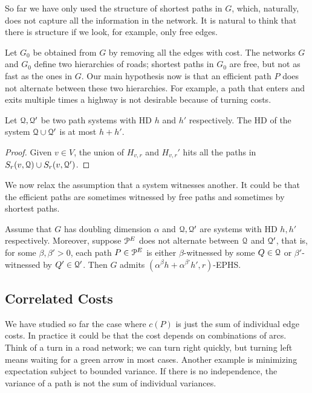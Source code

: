 
So far we have only used the structure of shortest paths in $G$, which, naturally, does not capture all the information in the network.
It is natural to think that there is structure if we look, for example, only free edges.

Let $G_0$ be obtained from $G$ by removing all the edges with cost.
The networks $G$ and $G_0$ define two hierarchies of roads; shortest paths in $G_0$ are free, but not as fast as the ones in $G$.
Our main hypothesis now is that an efficient path $P$ does not alternate between these two hierarchies.
For example, a path that enters and exits multiple times a highway is not desirable because of turning costs.

\begin{proposition}
Let $\mathcal{Q},\mathcal{Q}'$ be two path systems with HD $h$ and $h'$ respectively.
The HD of the system $\mathcal{Q}\cup\mathcal{Q}'$ is at most $h+h'$.
\end{proposition}
\begin{proof}
Given $v\in V$, the union of $H_{v,r}$ and $H_{v,r}'$ hits all the paths in $S_r(v,\mathcal{Q})\cup S_r(v,\mathcal{Q}')$.
\end{proof}

We now relax the assumption that a system witnesses another.
It could be that the efficient paths are sometimes witnessed by free paths and sometimes by shortest paths.

\begin{theorem}
Assume that $G$ has doubling dimension $\alpha$ and $\mathcal{Q},\mathcal{Q}'$ are systems with HD $h,h'$ respectively. 
Moreover, suppose $\mathcal{P}^E$ does not alternate between $\mathcal{Q}$ and $\mathcal{Q}'$, that is, for some $\beta,\beta'>0$, each path $P\in\mathcal{P}^E$ is either $\beta$-witnessed by some $Q\in\mathcal{Q}$ or $\beta'$-witnessed by $Q'\in\mathcal{Q}'$. Then $G$ admits  $(\alpha^{\beta}h+\alpha^{\beta'}h',r)$-EPHS.
\end{theorem}


\subsection{Correlated Costs}
We have studied so far the case where $c(P)$ is just the sum of individual edge costs.
In practice it could be that the cost depends on combinations of arcs.
Think of a turn in a road network; we can turn right quickly, but turning left means waiting for a green arrow in most cases.
Another example is minimizing expectation subject to bounded variance.
If there is no independence, the variance of a path is not the sum of individual variances.

